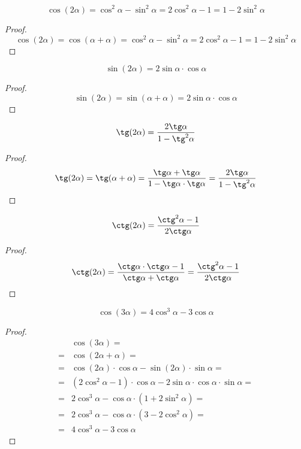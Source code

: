 \documentclass[12pt]{article}
\begin{document}
    \begin{statement}
        $$\cos (2\alpha)=\cos^2\alpha-\sin^2\alpha=2\cos^2\alpha-1=1-2\sin^2\alpha$$
    \end{statement}
    \begin{proof}
        $$\cos (2\alpha)=\cos(\alpha + \alpha)=\cos^2\alpha-\sin^2\alpha=2\cos^2\alpha-1=1-2\sin^2\alpha$$
    \end{proof}
    \begin{statement}
        $$\sin(2\alpha)=2 \sin \alpha \cdot \cos \alpha$$
    \end{statement}
    \begin{proof}
        $$\sin(2\alpha)=\sin(\alpha+\alpha)=2 \sin \alpha \cdot \cos \alpha$$
    \end{proof}
    \begin{statement}
        $$\tg(2\alpha)=\dfrac{2\tg\alpha}{1-\tg^2\alpha}$$
    \end{statement}
    \begin{proof}
        $$\tg(2\alpha)=\tg(\alpha+\alpha)=\dfrac{\tg\alpha+\tg\alpha}{1-\tg\alpha\cdot\tg\alpha}=\dfrac{2\tg\alpha}{1-\tg^2\alpha}$$
    \end{proof}
    \begin{statement}
        $$\ctg(2\alpha)=\dfrac{\ctg^2\alpha-1}{2\ctg\alpha}$$
    \end{statement}
    \begin{proof}
        $$\ctg(2\alpha)=\dfrac{\ctg\alpha\cdot\ctg\alpha-1}{\ctg\alpha+\ctg\alpha}=\dfrac{\ctg^2\alpha-1}{2\ctg\alpha}$$
    \end{proof}
    \begin{statement}
        $$\cos(3\alpha)=4\cos^3\alpha-3\cos\alpha$$
    \end{statement}
    \begin{proof}
        \begin{align*}
            &\cos(3\alpha)=\\
            =&\cos(2\alpha+\alpha)=\\
            =&\cos(2\alpha)\cdot\cos\alpha-\sin(2\alpha)\cdot\sin\alpha=\\
            =&(2\cos^2\alpha-1)\cdot\cos\alpha-2\sin\alpha\cdot\cos\alpha\cdot\sin\alpha=\\
            =&2\cos^3\alpha-\cos\alpha\cdot(1+2\sin^2\alpha)=\\
            =&2\cos^3\alpha-\cos\alpha\cdot(3-2\cos^2\alpha)=\\
            =&4\cos^3\alpha-3\cos\alpha
        \end{align*}
    \end{proof}
\end{document}
